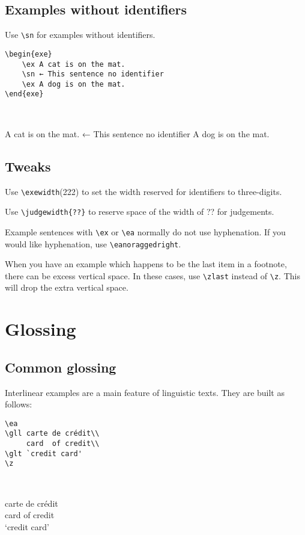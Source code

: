 \documentclass[output=paper]{langscibook}
\newcommand{\cmd}[1]{\texttt{\textbackslash#1}}
\begin{document}
\subsection{Examples without identifiers}
Use \cmd{sn} for examples without identifiers.

\begin{minipage}[t]{.55\textwidth}
\begin{lstlisting}
\begin{exe}
    \ex A cat is on the mat. 
    \sn ← This sentence no identifier
    \ex A dog is on the mat. 
\end{exe}
 \end{lstlisting}
\end{minipage}~
\parbox[t]{.45\textwidth}{
\begin{exe}
    \ex A cat is on the mat. 
    \sn ← This sentence no identifier
    \ex A dog is on the mat. 
\end{exe}
}

\subsection{Tweaks}
Use \cmd{exewidth}{(222)} to set the width reserved for identifiers to three-digits. 

Use \cmd{judgewidth\{??\}} to reserve space of the width of ?? for judgements. 

Example sentences with \cmd{ex} or \cmd{ea} normally do not use hyphenation. If you would like hyphenation, use \cmd{eanoraggedright}.

When you have an example which happens to be the last item in a footnote, there can be excess vertical space. In these cases, use \cmd{zlast} instead of \cmd{z}. This will drop the extra vertical space.

 
\section{Glossing}
\subsection{Common glossing}
Interlinear examples are a main feature of linguistic texts. They are built as follows: 

\begin{minipage}[t]{.55\textwidth}
\begin{lstlisting}
\ea
\gll carte de crédit\\
     card  of credit\\
\glt `credit card'     
\z
 \end{lstlisting}
\end{minipage}~
\parbox[t]{.45\textwidth}{ 
\ea
\gll carte de crédit\\
     card  of credit\\
\glt `credit card'     
\z 
}
\end{document}

